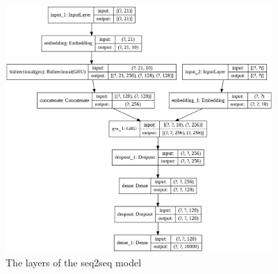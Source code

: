 \documentclass{article}
\begin{document}
\begin{figure}[htbp]
\centering
\includegraphics[width=4in]{images/model.png}
\caption{The layers of the seq2seq model}
\label{model}
\end{figure}
\end{document}
